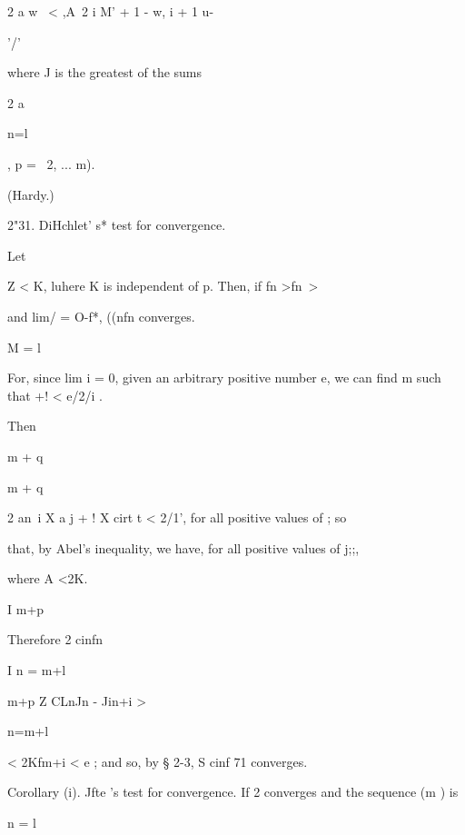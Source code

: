 2 a w \ < ,A\ 2 i M' + 1 - w, i + 1 u-



'/'



where J is the greatest of the sums



2 a

n=l



, p = \, 2, ... m).



(Hardy.)



2"31. DiHchlet' s* test for convergence.



Let



Z < K, luhere K is independent of p. Then, if fn >fn\-\ >



and lim/ = O-f*, ((nfn converges.

M = l

For, since lim i = 0, given an arbitrary positive number e, we can
find m such that +! < e/2/i .



Then



m + q



m + q



2 an\ i X a j + ! X cirt t < 2/1', for all positive values of ; so



that, by Abel's inequality, we have, for all positive values of j;;,



where A <2K.

I m+p

Therefore 2 cinfn

I n = m+l



m+p Z CLnJn - Jin+i >



n=m+l



< 2Kfm+i < e ; and so, by § 2-3, S cinf 71 converges.



Corollary (i). Jfte 's test for convergence. If 2 converges and the
sequence (m ) is

n = l

